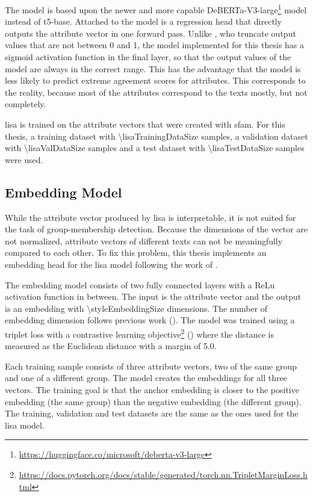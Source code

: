 The model is based upon the newer and more capable DeBERTa-V3-large\footnote{\url{https://huggingface.co/microsoft/deberta-v3-large}} model instead of t5-base. Attached to the model is a regression head that directly outputs the attribute vector in one forward pass. Unlike \citet{patelLearningInterpretableStyle2023}, who truncate output values that are not between \num{0} and \num{1}, the model implemented for this thesis has a sigmoid activation function in the final layer, so that the output values of the model are always in the correct range. This has the advantage that the model is less likely to predict extreme agreement scores for attributes. This corresponds to the reality, because most of the attributes correspond to the texts mostly, but not completely.

\ac{lisa} is trained on the attribute vectors that were created with \ac{sfam}. For this thesis, a training dataset with \num{\lisaTrainingDataSize} samples, a validation dataset with \num{\lisaValDataSize} samples and a test dataset with \num{\lisaTestDataSize} samples were used.


\subsection{Embedding Model}
\label{sec:experiments:setup:embedder}
While the attribute vector produced by \ac{lisa} is interpretable, it is not suited for the task of group-membership detection. Because the dimensions of the vector are not normalized, attribute vectors of different texts can not be meaningfully compared to each other. To fix this problem, this thesis implements an embedding head for the \ac{lisa} model following the work of \citet{patelLearningInterpretableStyle2023}.

The embedding model consists of two fully connected layers with a ReLu activation function in between. The input is the attribute vector and the output is an embedding with \num{\styleEmbeddingSize} dimensions. The number of embedding dimension follows previous work (\cite{patelLearningInterpretableStyle2023}). The model was trained using a triplet loss with a contrastive learning objective\footnote{\url{https://docs.pytorch.org/docs/stable/generated/torch.nn.TripletMarginLoss.html}} (\cite{NEURIPS2020_d89a66c7}) where the distance is measured as the Euclidean distance with a margin of \num{5.0}.

Each training sample consists of three attribute vectors, two of the same group and one of a different group. The model creates the embeddings for all three vectors. The training goal is that the anchor embedding is closer to the positive embedding (the same group) than the negative embedding (the different group). The training, validation and test datasets are the same as the ones used for the \ac{lisa} model.



